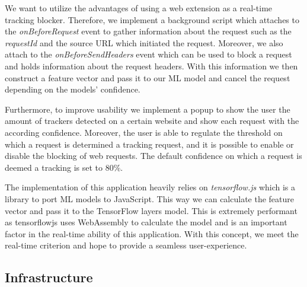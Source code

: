 We want to utilize the advantages of using a web extension as a real-time tracking blocker. Therefore, we implement a background script
which attaches to the \emph{onBeforeRequest} event to gather information about the request such as the \emph{requestId} and the source URL 
which initiated the request. Moreover, we also attach to the \emph{onBeforeSendHeaders} event which can be used to block a request and holds
information about the request headers. With this information we then construct a feature vector and pass it to our ML model and cancel the 
request depending on the models' confidence. 

Furthermore, to improve usability we implement a popup to show the user the amount of trackers detected on a certain website and show
each request with the according confidence. Moreover, the user is able to regulate the threshold on which a request is determined a 
tracking request, and it is possible to enable or disable the blocking of web requests. The default confidence on which a request
is deemed a tracking is set to 80\%.

The implementation of this application heavily relies on \emph{tensorflow.js} \cite{tensorflowJs} which is a library to port ML models to
JavaScript. This way we can calculate the feature vector and pass it to the TensorFlow layers model. This is extremely
performant as tensorflowjs uses WebAssembly to calculate the model and is an important factor in the real-time ability of this application.
With this concept, we meet the real-time criterion and hope to provide a seamless user-experience.

\subsection{Infrastructure}

